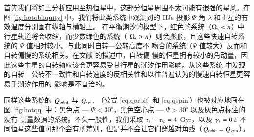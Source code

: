 
首先我们将如上分析应用至热恒星中，这部分恒星周围不太可能有很强的星风。在图 \ref{fig:hotobliquity} 
中，我们将此类系统中观测到的 HJs 投影 $\Psi$ 角 $\lambda$ 和主星的有效温度分别画在纵轴与横轴上。
在平衡潮汐的模型下，红色的系统（$\Omega_\mathrm{s} < n$）中行星轨道将会收缩，而少数绿色的系统（
$\Omega_\mathrm{s} > n$）则会膨胀，且这些快速自转系统的 $\Psi$ 值相对较小。与此同时自转---公转高度不
吻合的系统（$\Psi$ 值较大）反而和自转偏慢的系统相关。在文献  的描述中，自转偏
慢的恒星拥有较小的角动量，因此这些主星的自转轴应该会更容易受其行星的潮汐作用影响。从这些系统
中发现的自转---公转不一致性和自转速度的反相关性和以往普遍认为的慢速自转恒星更容易手潮汐作用的
影响是不自洽的\cite{Rogers2013,Li2016}。

同样这些系统的  $Q_\mathrm{orbit}$ 与 $Q_\mathrm{spin}$ （公式 \ref{eq:qorbit} 和 \ref{eq:qspin}）也被对应地画在
图 \ref{fig:hotqq} 中：黑色点 --- $\Psi < 30^\circ$，黑色空心点 --- $\Psi > 30^\circ$ 以及灰色点标注的没有
测量数据的系统。不失一般性，我们采取 $\tau_\mathrm{s} \sim \tau_\odot = 4 $ Gyr，以及 $\gamma_\mathrm{s} = 0.2$
不同恒星这些值可那个会有所差别，但是并不会让它们穿越对角线（$Q_\mathrm{orbit} = Q_\mathrm{spin}$）。

